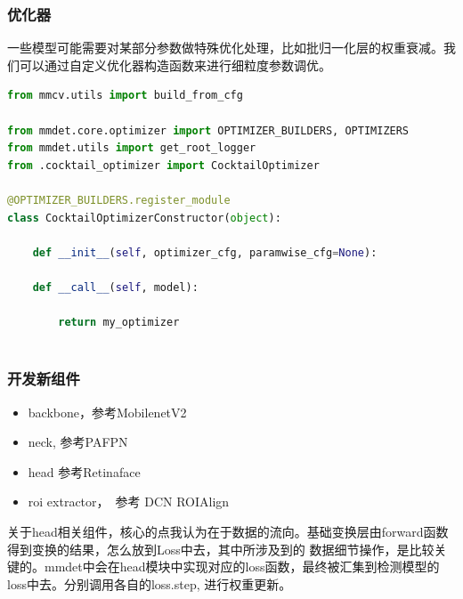 \documentclass[UTF8]{ctexart}
\begin{document}
\subsubsection{优化器}

一些模型可能需要对某部分参数做特殊优化处理，比如批归一化层的权重衰减。我们可以通过自定义优化器构造函数来进行细粒度参数调优。
\lstset{style=mystyle}
\begin{lstlisting}[language=Python]
from mmcv.utils import build_from_cfg

from mmdet.core.optimizer import OPTIMIZER_BUILDERS, OPTIMIZERS
from mmdet.utils import get_root_logger
from .cocktail_optimizer import CocktailOptimizer

@OPTIMIZER_BUILDERS.register_module
class CocktailOptimizerConstructor(object):

	def __init__(self, optimizer_cfg, paramwise_cfg=None):

	def __call__(self, model):

		return my_optimizer
	
\end{lstlisting}


\subsubsection{开发新组件}

\begin{itemize}
	\item backbone，参考MobilenetV2
	\item neck, 参考PAFPN
	\item head 参考Retinaface
	\item roi extractor，　参考 DCN ROIAlign
\end{itemize}

关于head相关组件，核心的点我认为在于数据的流向。基础变换层由forward函数得到变换的结果，怎么放到Loss中去，其中所涉及到的
数据细节操作，是比较关键的。mmdet中会在head模块中实现对应的loss函数，最终被汇集到检测模型的loss中去。分别调用各自的loss.step, 进行权重更新。
\end{document}

